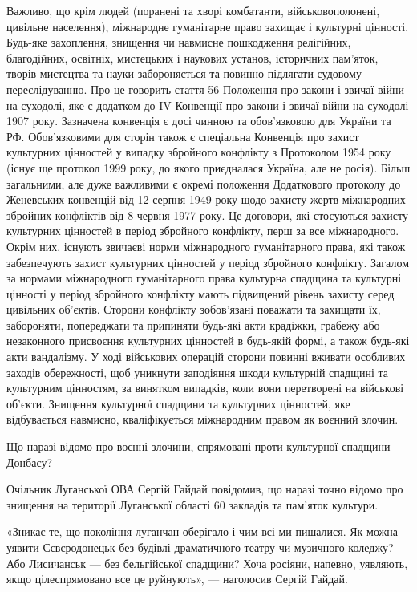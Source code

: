 Важливо, що крім людей (поранені та хворі комбатанти, військовополонені,
цивільне населення), міжнародне гуманітарне право захищає і культурні цінності.
Будь-яке захоплення, знищення чи навмисне пошкодження релігійних, благодійних,
освітніх, мистецьких і наукових установ, історичних пам'яток, творів мистецтва
та науки забороняється та повинно підлягати судовому переслідуванню. Про це
говорить стаття 56 Положення про закони і звичаї війни на суходолі, яке є
додатком до IV Конвенції про закони і звичаї війни на суходолі 1907 року.
Зазначена конвенція є досі чинною та обов'язковою для України та РФ.
Обов'язковими для сторін також є спеціальна Конвенція про захист культурних
цінностей у випадку збройного конфлікту з Протоколом 1954 року (існує ще
протокол 1999 року, до якого приєдналася Україна, але не росія). Більш
загальними, але дуже важливими є окремі положення Додаткового протоколу до
Женевських конвенцій від 12 серпня 1949 року щодо захисту жертв міжнародних
збройних конфліктів від 8 червня 1977 року. Це договори, які стосуються захисту
культурних цінностей в період збройного конфлікту, перш за все міжнародного.
Окрім них, існують звичаєві норми міжнародного гуманітарного права, які також
забезпечують захист культурних цінностей у період збройного конфлікту. Загалом
за нормами міжнародного гуманітарного права культурна спадщина та культурні
цінності у період збройного конфлікту мають підвищений рівень захисту серед
цивільних об'єктів. Сторони конфлікту зобов'язані поважати та захищати їх,
забороняти, попереджати та припиняти будь-які акти крадіжки, грабежу або
незаконного присвоєння культурних цінностей в будь-якій формі, а також будь-які
акти вандалізму. У ході військових операцій сторони повинні вживати особливих
заходів обережності, щоб уникнути заподіяння шкоди культурній спадщині та
культурним цінностям, за винятком випадків, коли вони перетворені на військові
об'єкти. Знищення культурної спадщини та культурних цінностей, яке відбувається
навмисно, кваліфікується міжнародним правом як воєнний злочин. 

Що наразі відомо про воєнні злочини, спрямовані проти культурної спадщини Донбасу?

Очільник Луганської ОВА Сергій Гайдай повідомив, що наразі точно відомо про
знищення на території Луганської області 60 закладів та пам'яток культури.

«Зникає те, що покоління луганчан оберігало і чим всі ми пишалися. Як можна
уявити Сєвєродонецьк без будівлі драматичного театру чи музичного коледжу? Або
Лисичанськ — без бельгійської спадщини? Хоча росіяни, напевно, уявляють, якщо
цілеспрямовано все це руйнують», — наголосив Сергій Гайдай.

